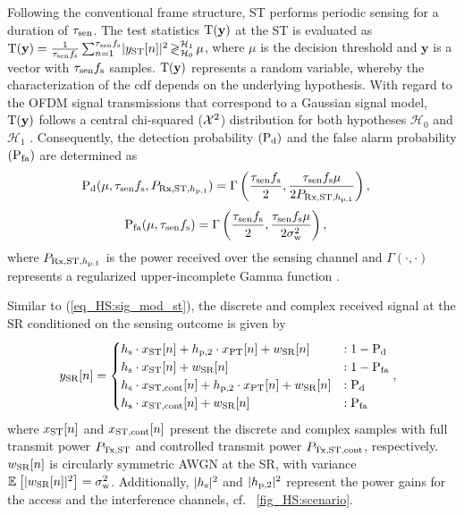 Following the conventional frame structure, ST performs periodic sensing for a duration of $\tau_{\text{sen}}$. The test statistics $\operatorname*{\text{T}(\textbf{y})}$ at the ST is evaluated as $\operatorname*{\text{T}(\textbf{y})} = {\frac{1}{{\tau_{\text{sen}} f_{\text{s}}}}\sum_{n=1}^{\tau_{\text{sen}} f_{\text{s}}}} { |y_{\text{ST}}[n]|^2} \mathop{\gtrless}_{\mathcal{H}_0}^{\mathcal{H}_1} \mu$, where $\mu$ is the decision threshold and $\textbf{y}$ is a vector with $\tau_{\text{sen}} f_{\text{s}}$ samples. $\operatorname*{\text{T}(\textbf{y})}$ represents a random variable, whereby the characterization of the cdf depends on the underlying hypothesis. With regard to the OFDM signal transmissions that correspond to a Gaussian signal model, $\operatorname*{\text{T}(\textbf{y})}$ follows a central chi-squared ($\cchi2$) distribution for both hypotheses $\mathcal H_0$ and $\mathcal H_1$ \cite{Kay}.
Consequently, the detection probability $(\text{P}_{\text{d}})$ and the false alarm probability $(\text{P}_{\text{fa}})$ are determined as \cite{Tan08}
\begin{align}
\text{P}_{\text{d}}(\mu, \tau_{\text{sen}} f_{\text{s}}, P_{\text{Rx,ST,$h_{\text{p,1}}$}}) &= \Gamma\left( \frac{\tau_{\text{sen}} f_{\text{s}}}{2}, \frac{\tau_{\text{sen}} f_{\text{s}} \mu}{2 P_{\text{Rx,ST,$h_{\text{p,1}}$}}} \right),  \label{eq_HS:pd} 
\end{align}
\begin{align}
\text{P}_{\text{fa}}(\mu, \tau_{\text{sen}} f_{\text{s}}) &= \Gamma\left( \frac{\tau_{\text{sen}} f_{\text{s}}}{2}, \frac{\tau_{\text{sen}} f_{\text{s}} \mu}{2 \sigma^2_{\text{w}}} \right),  \label{eq_HS:pfa} 
\end{align}
where $P_{\text{Rx,ST,$h_{\text{p,1}}$}}$ is the power received over the sensing channel and $\Gamma(\cdot, \cdot)$ represents a regularized upper-incomplete Gamma function \cite{grad}.

Similar to (\ref{eq_HS:sig_mod_st}), the discrete and complex received signal at the SR conditioned on the sensing outcome is given by 
\begin{equation}
\hspace{-2.3mm}
\ys[n] = 
\begin{cases}
\hs \cdot \xsfull[n] + \hptw \cdot \xp[n] + \wsr[n] &: 1 - \pd \\
\hs \cdot \xsfull[n] + \wsr[n] &: 1 - \pfa \\
\hs \cdot \xscont[n] + \hptw \cdot \xp[n] + \wsr[n] &: \pd \\
\hs \cdot \xscont[n] + \wsr[n] &: \pfa 
\end{cases},
\label{eq_HS:sig_mod_sr}
\end{equation}
where $x_{\text{ST}}[n]$ and $x_{\text{ST,cont}}[n]$ present the discrete and complex samples with full transmit power $P_{\text{Tx,ST}}$ and controlled transmit power $P_{\text{Tx,ST,cont}}$, respectively. $w_{\text{SR}}[n]$ is circularly symmetric AWGN at the SR, with variance ${\mathbb E}_{}\left[ |w_{\text{SR}}[n]|^2 \right] = \sigma^2_{\text{w}}$. Additionally, $|h_{\text{s}}|^2$ and $|h_{\text{p,2}}|^2$ represent the power gains for the access and the interference channels, cf. \figurename~\ref{fig_HS:scenario}. 


